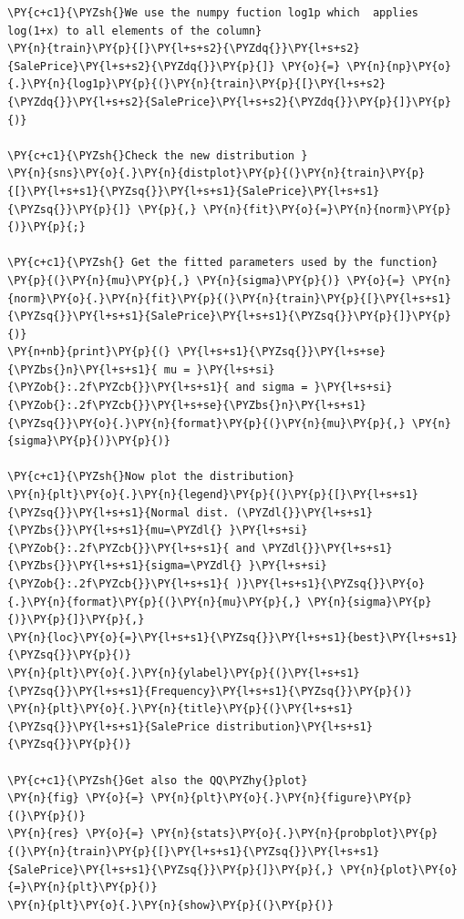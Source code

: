 \documentclass[no-math]{YangThesis}
\begin{document}
\begin{tcolorbox}[breakable, size=fbox, boxrule=1pt, pad at break*=1mm,colback=cellbackground, colframe=cellborder]
	\begin{Verbatim}[commandchars=\\\{\}]
\PY{c+c1}{\PYZsh{}We use the numpy fuction log1p which  applies log(1+x) to all elements of the column}
\PY{n}{train}\PY{p}{[}\PY{l+s+s2}{\PYZdq{}}\PY{l+s+s2}{SalePrice}\PY{l+s+s2}{\PYZdq{}}\PY{p}{]} \PY{o}{=} \PY{n}{np}\PY{o}{.}\PY{n}{log1p}\PY{p}{(}\PY{n}{train}\PY{p}{[}\PY{l+s+s2}{\PYZdq{}}\PY{l+s+s2}{SalePrice}\PY{l+s+s2}{\PYZdq{}}\PY{p}{]}\PY{p}{)}

\PY{c+c1}{\PYZsh{}Check the new distribution }
\PY{n}{sns}\PY{o}{.}\PY{n}{distplot}\PY{p}{(}\PY{n}{train}\PY{p}{[}\PY{l+s+s1}{\PYZsq{}}\PY{l+s+s1}{SalePrice}\PY{l+s+s1}{\PYZsq{}}\PY{p}{]} \PY{p}{,} \PY{n}{fit}\PY{o}{=}\PY{n}{norm}\PY{p}{)}\PY{p}{;}

\PY{c+c1}{\PYZsh{} Get the fitted parameters used by the function}
\PY{p}{(}\PY{n}{mu}\PY{p}{,} \PY{n}{sigma}\PY{p}{)} \PY{o}{=} \PY{n}{norm}\PY{o}{.}\PY{n}{fit}\PY{p}{(}\PY{n}{train}\PY{p}{[}\PY{l+s+s1}{\PYZsq{}}\PY{l+s+s1}{SalePrice}\PY{l+s+s1}{\PYZsq{}}\PY{p}{]}\PY{p}{)}
\PY{n+nb}{print}\PY{p}{(} \PY{l+s+s1}{\PYZsq{}}\PY{l+s+se}{\PYZbs{}n}\PY{l+s+s1}{ mu = }\PY{l+s+si}{\PYZob{}:.2f\PYZcb{}}\PY{l+s+s1}{ and sigma = }\PY{l+s+si}{\PYZob{}:.2f\PYZcb{}}\PY{l+s+se}{\PYZbs{}n}\PY{l+s+s1}{\PYZsq{}}\PY{o}{.}\PY{n}{format}\PY{p}{(}\PY{n}{mu}\PY{p}{,} \PY{n}{sigma}\PY{p}{)}\PY{p}{)}

\PY{c+c1}{\PYZsh{}Now plot the distribution}
\PY{n}{plt}\PY{o}{.}\PY{n}{legend}\PY{p}{(}\PY{p}{[}\PY{l+s+s1}{\PYZsq{}}\PY{l+s+s1}{Normal dist. (\PYZdl{}}\PY{l+s+s1}{\PYZbs{}}\PY{l+s+s1}{mu=\PYZdl{} }\PY{l+s+si}{\PYZob{}:.2f\PYZcb{}}\PY{l+s+s1}{ and \PYZdl{}}\PY{l+s+s1}{\PYZbs{}}\PY{l+s+s1}{sigma=\PYZdl{} }\PY{l+s+si}{\PYZob{}:.2f\PYZcb{}}\PY{l+s+s1}{ )}\PY{l+s+s1}{\PYZsq{}}\PY{o}{.}\PY{n}{format}\PY{p}{(}\PY{n}{mu}\PY{p}{,} \PY{n}{sigma}\PY{p}{)}\PY{p}{]}\PY{p}{,}
\PY{n}{loc}\PY{o}{=}\PY{l+s+s1}{\PYZsq{}}\PY{l+s+s1}{best}\PY{l+s+s1}{\PYZsq{}}\PY{p}{)}
\PY{n}{plt}\PY{o}{.}\PY{n}{ylabel}\PY{p}{(}\PY{l+s+s1}{\PYZsq{}}\PY{l+s+s1}{Frequency}\PY{l+s+s1}{\PYZsq{}}\PY{p}{)}
\PY{n}{plt}\PY{o}{.}\PY{n}{title}\PY{p}{(}\PY{l+s+s1}{\PYZsq{}}\PY{l+s+s1}{SalePrice distribution}\PY{l+s+s1}{\PYZsq{}}\PY{p}{)}

\PY{c+c1}{\PYZsh{}Get also the QQ\PYZhy{}plot}
\PY{n}{fig} \PY{o}{=} \PY{n}{plt}\PY{o}{.}\PY{n}{figure}\PY{p}{(}\PY{p}{)}
\PY{n}{res} \PY{o}{=} \PY{n}{stats}\PY{o}{.}\PY{n}{probplot}\PY{p}{(}\PY{n}{train}\PY{p}{[}\PY{l+s+s1}{\PYZsq{}}\PY{l+s+s1}{SalePrice}\PY{l+s+s1}{\PYZsq{}}\PY{p}{]}\PY{p}{,} \PY{n}{plot}\PY{o}{=}\PY{n}{plt}\PY{p}{)}
\PY{n}{plt}\PY{o}{.}\PY{n}{show}\PY{p}{(}\PY{p}{)}
	\end{Verbatim}
\end{tcolorbox}
\end{document}
